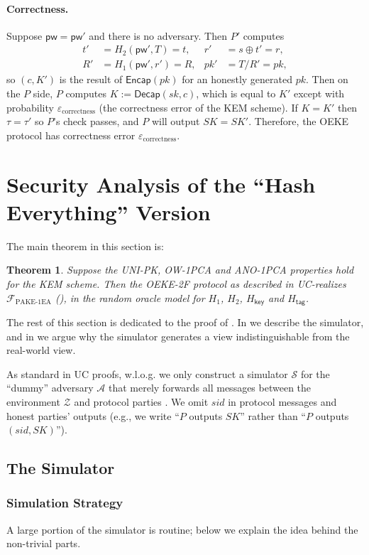 \documentclass{article}
\theoremstyle{plain}
\newtheorem{theorem}{Theorem}
\theoremstyle{definition}
\theoremstyle{remark}
\newcommand{\adv}{\mathcal{A}}
\newcommand{\env}{\mathcal{Z}}
\renewcommand{\sim}{\mathcal{S}}
\newcommand{\func}{\mathcal{F}}
\newcommand{\Fpake}{\func_\mathrm{PAKE\text{-}1EA}}
\newcommand{\Encap}{\mathsf{Encap}}
\newcommand{\Decap}{\mathsf{Decap}}
\newcommand{\Hkey}{H_\mathsf{key}}
\newcommand{\Htag}{H_\mathsf{tag}}
\newcommand{\pw}{\mathsf{pw}}
\begin{document}
\paragraph{Correctness.}
Suppose $\pw = \pw'$ and there is no adversary. Then $P'$ computes
\begin{align*}
t' &= H_2(\pw',T) = t, &r' &= s \oplus t' = r, \\
R' &= H_1(\pw',r') = R, &pk' &= T/R' = pk,
\end{align*}
so $(c,K')$ is the result of $\Encap(pk)$ for an honestly generated $pk$. Then on the $P$ side, $P$ computes $K := \Decap(sk,c)$, which is equal to $K'$ except with probability $\varepsilon_\text{correctness}$ (the correctness error of the KEM scheme). If $K = K'$ then $\tau = \tau'$ so $P$'s check passes, and $P$ will output $SK = SK'$. Therefore, the OEKE protocol has correctness error $\varepsilon_\text{correctness}$.

\section{Security Analysis of the ``Hash Everything'' Version}
\label{sec:basic}

The main theorem in this section is:
\begin{theorem}
\label{thm:basic}
Suppose the UNI-PK, OW-1PCA and ANO-1PCA properties hold for the KEM scheme. Then the OEKE-2F protocol as described in  UC-realizes $\Fpake$ (), in the random oracle model for $H_1$, $H_2$, $\Hkey$ and $\Htag$.
\end{theorem}
The rest of this section is dedicated to the proof of . In  we describe the simulator, and in  we argue why the simulator generates a view indistinguishable from the real-world view.

As standard in UC proofs, w.l.o.g. we only construct a simulator $\sim$ for the ``dummy'' adversary $\adv$ that merely forwards all messages between the environment $\env$ and protocol parties \cite[Claim~11]{FOCS:Canetti01}. We omit $sid$ in protocol messages and honest parties' outputs (e.g., we write ``$P$ outputs $SK$'' rather than ``$P$ outputs $(sid,SK)$'').

\subsection{The Simulator}
\label{sec:simulator}
\subsubsection{Simulation Strategy}
\label{sec:sim-intuition}
A large portion of the simulator is routine; below we explain the idea behind the non-trivial parts.
\end{document}
